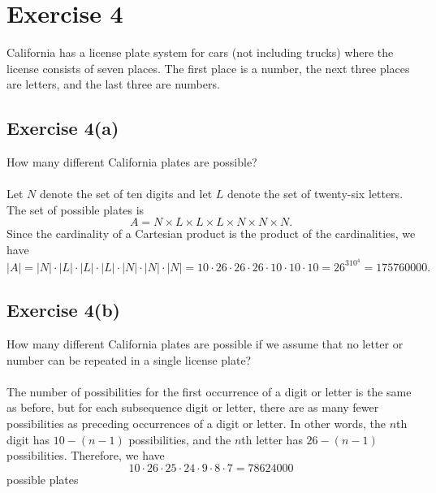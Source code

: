\documentclass[12pt]{article}
\newenvironment{problem}
    {\begin{lrbox}{\mybox}\begin{minipage}{\textwidth-10pt}}
    {\end{minipage}\end{lrbox}\framebox[6.5in]{\usebox{\mybox}}}
\begin{document}
\section*{Exercise 4}
\begin{problem}
    California has a license plate system for cars (not including trucks) where the license consists of seven places. The first place is a number, the next three places are letters, and the last three are numbers.
\end{problem}

\subsection*{Exercise 4(a)}
\begin{problem}
    How many different California plates are possible?
\end{problem}
\paragraph{}

Let $N$ denote the set of ten digits and let $L$ denote the set of twenty-six letters. The set of possible plates is
\[A = N \times L \times L \times L \times N \times N \times N.\]
Since the cardinality of a Cartesian product is the product of the cardinalities, we have
\[|A| = |N|\cdot|L|\cdot|L|\cdot|L|\cdot|N|\cdot|N|\cdot|N| = 10\cdot26\cdot26\cdot26\cdot10\cdot10\cdot10 = 26^310^4 = 175760000.\]

\subsection*{Exercise 4(b)}
\begin{problem}
    How many different California plates are possible if we assume that no letter or number can be repeated in a single license plate?
\end{problem}
\paragraph{}

The number of possibilities for the first occurrence of a digit or letter is the same as before, but for each subsequence digit or letter, there are as many fewer possibilities as preceding occurrences of a digit or letter. In other words, the $n$th digit has $10-(n-1)$ possibilities, and the $n$th letter has $26-(n-1)$ possibilities. Therefore, we have
\[10\cdot26\cdot25\cdot24\cdot9\cdot8\cdot7 = 78624000\]
possible plates
\end{document}
